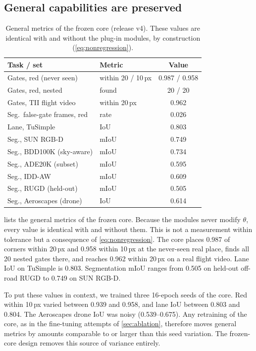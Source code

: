 \documentclass[10pt,twocolumn,letterpaper]{article}
\begin{document}
\subsection{General capabilities are preserved}
\label{sec:general}
\begin{table}[t]
  \centering
  \small
  \begin{tabular}{@{}llc@{}}
    \toprule
    Task / set & Metric & Value \\
    \midrule
    Gates, red (never seen) & within 20 / 10\,px & 0.987 / 0.958 \\
    Gates, red, nested & found & 20 / 20 \\
    Gates, TII flight video & within 20\,px & 0.962 \\
    Seg.\ false-gate frames, red & rate & 0.026 \\
    Lane, TuSimple & IoU & 0.803 \\
    Seg., SUN RGB-D & mIoU & 0.749 \\
    Seg., BDD100K (sky-aware) & mIoU & 0.734 \\
    Seg., ADE20K (subset) & mIoU & 0.595 \\
    Seg., IDD-AW & mIoU & 0.609 \\
    Seg., RUGD (held-out) & mIoU & 0.505 \\
    Seg., Aeroscapes (drone) & IoU & 0.614 \\
    \bottomrule
  \end{tabular}
  \caption{General metrics of the frozen core (release v4). These values are identical with and without the plug-in modules, by construction (\cref{eq:nonregression}).}
  \label{tab:general}
\end{table}

 lists the general metrics of the frozen core. Because the modules never modify $\theta$, every value is identical with and without them. This is not a measurement within tolerance but a consequence of \cref{eq:nonregression}. The core places 0.987 of corners within 20\,px and 0.958 within 10\,px at the never-seen real place, finds all 20 nested gates there, and reaches 0.962 within 20\,px on a real flight video. Lane IoU on TuSimple is 0.803. Segmentation mIoU ranges from 0.505 on held-out off-road RUGD to 0.749 on SUN RGB-D.

To put these values in context, we trained three 16-epoch seeds of the core. Red within 10\,px varied between 0.939 and 0.958, and lane IoU between 0.803 and 0.804. The Aeroscapes drone IoU was noisy (0.539--0.675). Any retraining of the core, as in the fine-tuning attempts of \cref{sec:ablation}, therefore moves general metrics by amounts comparable to or larger than this seed variation. The frozen-core design removes this source of variance entirely.
\end{document}
